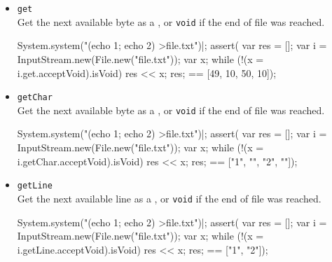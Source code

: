 \begin{itemize}
\item \lstinline|get|\\
  Get the next available byte as a , or
  \lstinline|void| if the end of file was reached.
\begin{urbiscript}
System.system("(echo 1; echo 2) >file.txt")|;
assert(
  {
    var res = [];
    var i = InputStream.new(File.new("file.txt"));
    var x;
    while (!(x = i.get.acceptVoid).isVoid)
      res << x;
    res;
  }
  ==
  [49, 10, 50, 10]);
\end{urbiscript}

\item \lstinline|getChar|\\
  Get the next available byte as a , or
  \lstinline|void| if the end of file was reached.
\begin{urbiscript}
System.system("(echo 1; echo 2) >file.txt")|;
assert(
  {
    var res = [];
    var i = InputStream.new(File.new("file.txt"));
    var x;
    while (!(x = i.getChar.acceptVoid).isVoid)
      res << x;
    res;
  }
  ==
  ["1", "\n", "2", "\n"]);
\end{urbiscript}

\item \lstinline|getLine|\\
  Get the next available line as a , or
  \lstinline|void| if the end of file was reached.
\begin{urbiscript}
System.system("(echo 1; echo 2) >file.txt")|;
assert(
  {
    var res = [];
    var i = InputStream.new(File.new("file.txt"));
    var x;
    while (!(x = i.getLine.acceptVoid).isVoid)
      res << x;
    res;
  }
  ==
  ["1", "2"]);
\end{urbiscript}
\end{itemize}


